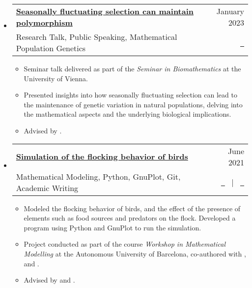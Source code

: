 \documentclass[a4paper,10pt]{article}
\makeatletter
\newcommand{\resumeItemListEnd}{\end{itemize}}
\newcommand{\resumeQuadHeading}[4]{
  \item
  \begin{tabular*}{0.96\textwidth}[t]{l@{\extracolsep{\fill}}r}
    \textbf{#1} & \small #2 \\
    \small#3 & \small #4 \\
  \end{tabular*}
}
\newcommand{\resumeHeadingListStart}{
  \begin{itemize}[leftmargin=0.15in, label={}]
}
\newcommand{\resumeHeadingListEnd}{\end{itemize}}
\makeatother
\begin{document}
  \resumeHeadingListStart{}
    \resumeQuadHeading{\href{https://github.com/loredanasandu/seminar-talk-biomathematics/blob/main/SanduLoredana_Presentation_SE_Biomathematics-Seasonally_fluctuating_selection_and_polymorphism.pdf}{Seasonally fluctuating selection can maintain polymorphism}}{January 2023}{Research Talk, Public Speaking, Mathematical Population Genetics}{\href{https://github.com/loredanasandu/seminar-talk-biomathematics/blob/main/SanduLoredana_Presentation_SE_Biomathematics-Seasonally_fluctuating_selection_and_polymorphism.pdf}{\faFileTextO \ \graydotuline{Slides}}}
    \begin{itemize}[leftmargin=3em, itemsep=0.1em, topsep=2pt]
      \item \small Seminar talk delivered as part of the \textit{Seminar in Biomathematics} at the University of Vienna.
      \item \small Presented insights into how seasonally fluctuating selection can lead to the maintenance of genetic variation in natural populations, delving into the mathematical aspects and the underlying biological implications.
      \item \small Advised by \href{https://ufind.univie.ac.at/en/person.html?id=33917}{}.
    \end{itemize}
  \resumeItemListEnd{}

  \resumeHeadingListStart{}
    \resumeQuadHeading{\href{https://github.com/loredanasandu/bird-flocks-simulation}{Simulation of the flocking behavior of birds}}{June 2021}{Mathematical Modeling, Python, GnuPlot, Git, Academic Writing}{\href{https://github.com/loredanasandu/bird-flocks-simulation/blob/main/report.pdf}{\faFileTextO \ \graydotuline{{Report \scriptsize (in Catalan)}}} \ $|$ \ \href{https://github.com/loredanasandu/bird-flocks-simulation}{\faGithub \ \graydotuline{Code}}}
    \begin{itemize}[leftmargin=3em, itemsep=0.1em, topsep=2pt]
      \item \small Modeled the flocking behavior of birds, and the effect of the presence of elements such as food sources and predators on the flock. Developed a program using Python and GnuPlot to run the simulation.
      \item \small Project conducted as part of the course \textit{Workshop in Mathematical Modelling} at the Autonomous University of Barcelona, co-authored with \href{https://www.linkedin.com/in/anna-danot-14a10b252}{}, \href{https://www.linkedin.com/in/nuria-fernandez-raventos/}{} and \href{https://www.linkedin.com/in/jan-mousavi-facundo/}{}.
      \item \small Advised by \href{https://mat.uab.cat/departament/uab/pop_ex.php?id=172&lang=cat}{} and \href{https://mat.uab.cat/departament/uab/pop_ex.php?id=208&lang=}{}.
    \end{itemize}
  \resumeHeadingListEnd{}
\end{document}
